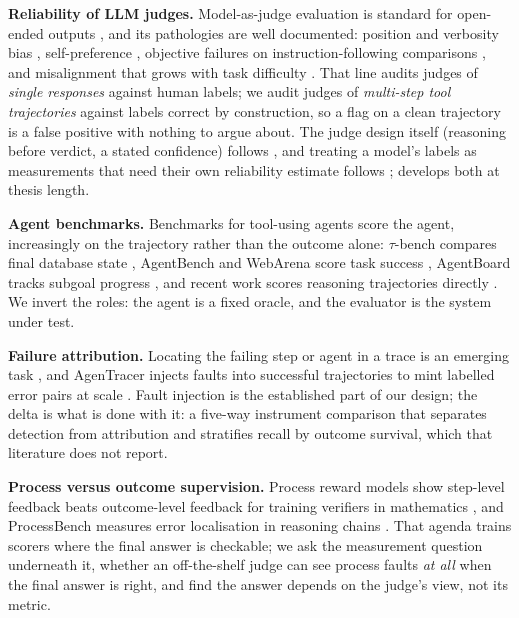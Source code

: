 \documentclass{article}
\begin{document}
\textbf{Reliability of LLM judges.} Model-as-judge evaluation is standard for open-ended
outputs \citep{zheng2023judging,liu2023geval,gu2024survey}, and its pathologies are
well documented: position and verbosity bias \citep{wang2023fair}, self-preference
\citep{panickssery2024self}, objective failures on instruction-following comparisons
\citep{zeng2024llmbar}, and misalignment that grows with task difficulty
\citep{thakur2024judging}. That line audits judges of \emph{single responses} against human
labels; we audit judges of \emph{multi-step tool trajectories} against labels correct by
construction, so a flag on a clean trajectory is a false positive with nothing to argue about.
The judge design itself (reasoning before verdict, a stated confidence) follows
\citet{mohammadi2026evalmoraal}, and treating a model's labels as measurements that need their
own reliability estimate follows \citet{mohammadi2025assessing}; \citet{mohammadi2026let} develops both at thesis length.

\textbf{Agent benchmarks.} Benchmarks for tool-using agents score the agent, increasingly on
the trajectory rather than the outcome alone: $\tau$-bench compares final database state
\citep{yao2024tau}, AgentBench and WebArena score task success \citep{liu2024agentbench,
zhou2024webarena}, AgentBoard tracks subgoal progress \citep{ma2024agentboard}, and recent
work scores reasoning trajectories directly \citep{kim2025beyond,he2025trajectbench}. We
invert the roles: the agent is a fixed oracle, and the evaluator is the system under test.

\textbf{Failure attribution.} Locating the failing step or agent in a trace is an emerging
task \citep{zhang2025whowhen,deshpande2025trail,cemri2025mast,ma2025failure}, and AgenTracer
injects faults into successful trajectories to mint labelled error pairs at scale
\citep{zhang2025agentracer}. Fault injection is the established part of our design; the delta
is what is done with it: a five-way instrument comparison that separates detection from
attribution and stratifies recall by outcome survival, which that literature does not report.

\textbf{Process versus outcome supervision.} Process reward models show step-level feedback
beats outcome-level feedback for training verifiers in mathematics
\citep{lightman2024verify,uesato2022solving,wang2024mathshepherd}, and ProcessBench measures
error localisation in reasoning chains \citep{zheng2024processbench,zhang2025lessons}. That
agenda trains scorers where the final answer is checkable; we ask the measurement question
underneath it, whether an off-the-shelf judge can see process faults \emph{at all} when the
final answer is right, and find the answer depends on the judge's view, not its metric.
\end{document}
